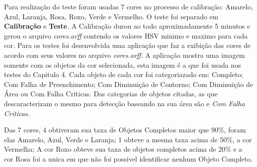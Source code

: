 Para realização do teste foram usadas 7 cores no processo de calibração: Amarelo, Azul, Laranja, Rosa, Roxo, Verde e Vermelho. O teste foi separado em \textbf{Calibração} e \textbf{Teste}. A Calibração durou ao todo aproximadamente 5 minutos e gerou o arquivo \textit{cores.arff} contendo os valores HSV minimo e maximo para cada cor. 
Para os testes foi desenvolvida uma aplicação que faz a exibição das cores de acordo com seus valores no arquivo \textit{cores.arff}. A aplicação mostra uma imagem somente com os objetos da cor selecionada, esta imagem é a que foi usada nos testes do Capitulo 4. Cada objeto de cada cor foi categoriazado em: Completo; Com Falha de Preenchimento; Com Diminuição de Contorno; Com Diminuição de Área ou Com Falha Criticas. 
Das categorias de objetos citadas, as que descaracterizam o mesmo para detecção baseando na sua área são  e \textit{Com Falha Criticas}.


Das 7 cores, 4 obtiveram sua taxa de Objetos Completos maior que 90\%, foram elas Amarelo, Azul, Verde e Laranja; 1 obteve a mesma taxa acima de 50\%, a cor Vermelha; A cor Roxo obteve sua taxa de objetos completos acima de 20\% e a cor Rosa foi a unica em que não foi possivel identificar nenhum Objeto Completo.
